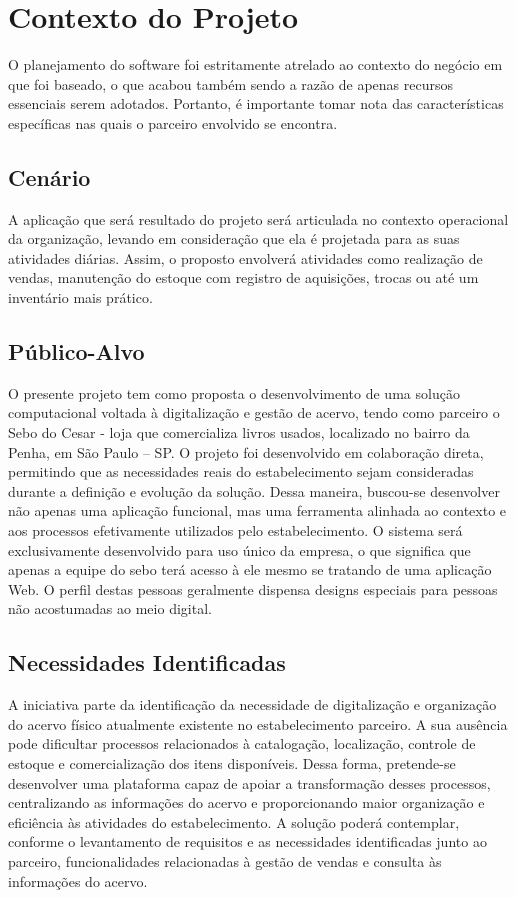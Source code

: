\chapter{Contexto do Projeto}

O planejamento do software foi estritamente atrelado ao contexto do negócio em que foi baseado, o que acabou também sendo a razão de apenas recursos essenciais serem adotados. Portanto, é importante tomar nota das características específicas nas quais o parceiro envolvido se encontra.

\section{Cenário}
A aplicação que será resultado do projeto será articulada no contexto operacional da organização, levando em consideração que ela é projetada para as suas atividades diárias. Assim, o proposto envolverá atividades como realização de vendas, manutenção do estoque com registro de aquisições, trocas ou até um inventário mais prático.

\section{Público-Alvo}
O presente projeto tem como proposta o desenvolvimento de uma solução computacional voltada à digitalização e gestão de acervo, tendo como parceiro o Sebo do Cesar - loja que comercializa livros usados, localizado no bairro da Penha, em São Paulo – SP.
O projeto foi desenvolvido em colaboração direta, permitindo que as necessidades reais do estabelecimento sejam consideradas durante a definição e evolução da solução. Dessa maneira, buscou-se desenvolver não apenas uma aplicação funcional, mas uma ferramenta alinhada ao contexto e aos processos efetivamente utilizados pelo estabelecimento.
O sistema será exclusivamente desenvolvido para uso único da empresa, o que significa que apenas a equipe do sebo terá acesso à ele mesmo se tratando de uma aplicação Web. O perfil destas pessoas geralmente dispensa designs especiais para pessoas não acostumadas ao meio digital.

\section{Necessidades Identificadas}
A iniciativa parte da identificação da necessidade de digitalização e organização do acervo físico atualmente existente no estabelecimento parceiro. A sua ausência pode dificultar processos relacionados à catalogação, localização, controle de estoque e comercialização dos itens disponíveis.
Dessa forma, pretende-se desenvolver uma plataforma capaz de apoiar a transformação desses processos, centralizando as informações do acervo e proporcionando maior organização e eficiência às atividades do estabelecimento. A solução poderá contemplar, conforme o levantamento de requisitos e as necessidades identificadas junto ao parceiro, funcionalidades relacionadas à gestão de vendas e consulta às informações do acervo.

